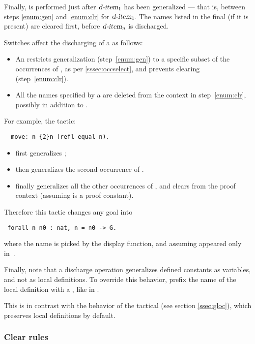 Finally, {\tac} is performed just after $\ssrN[1]{d-item}$ has been
generalized ---
that is, between steps \ref{enum:gen} and \ref{enum:clr} for $\ssrN[1]{d-item}$.
The names listed in the final  (if it is present)
are cleared first, before $\ssrN[n]{d-item}$ is discharged.

\noindent
Switches affect the discharging of a  as follows:
\begin{itemize}
\item An  restricts generalization (step~\ref{enum:gen})
      to a specific subset of the occurrences of {\term}, as per
      \ref{sssec:occselect}, and prevents clearing (step~\ref{enum:clr}).
\item All the names specified by a  are deleted from the
      context in step~\ref{enum:clr}, possibly in addition to {\term}.
\end{itemize}
For example, the tactic:
\begin{lstlisting}
  move: n {2}n (refl_equal n).
\end{lstlisting}
\begin{itemize}
\item first generalizes ;
\item then generalizes the second occurrence of .
\item finally generalizes all the other occurrences of ,
      and clears  from the proof context
      (assuming  is a proof constant).
\end{itemize}
Therefore this tactic changes any goal  into
\begin{lstlisting}
 forall n n0 : nat, n = n0 -> G.
\end{lstlisting}
where the name  is picked by the \Coq{} display function,
and assuming  appeared only in~.

Finally, note that a discharge operation generalizes defined constants
as variables, and not as local definitions. To override this behavior,
prefix the name of the local definition with a ,
like in .

This is in contrast with the behavior of the  tactical (see section
\ref{ssec:gloc}), which preserves local definitions by default.

\subsubsection*{Clear rules}

